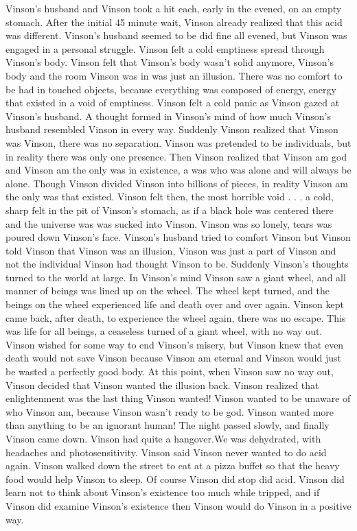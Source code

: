 \documentclass[12pt]{book}
\begin{document}
Vinson's husband and Vinson took a hit each, early in the evened, on an empty stomach. After the initial 45 minute wait, Vinson already realized that this acid was different. Vinson's husband seemed to be did fine all evened, but Vinson was engaged in a personal struggle. Vinson felt a cold emptiness spread through Vinson's body. Vinson felt that Vinson's body wasn't solid anymore, Vinson's body and the room Vinson was in was just an illusion. There was no comfort to be had in touched objects, because everything was composed of energy, energy that existed in a void of emptiness. Vinson felt a cold panic as Vinson gazed at Vinson's husband. A thought formed in Vinson's mind of how much Vinson's husband resembled Vinson in every way. Suddenly Vinson realized that Vinson was Vinson, there was no separation. Vinson was pretended to be individuals, but in reality there was only one presence. Then Vinson realized that Vinson am god and Vinson am the only was in existence, a was who was alone and will always be alone. Though Vinson divided Vinson into billions of pieces, in reality Vinson am the only was that existed. Vinson felt then, the most horrible void . . .  a cold, sharp felt in the pit of Vinson's stomach, as if a black hole was centered there and the universe was was sucked into Vinson. Vinson was so lonely, tears was poured down Vinson's face. Vinson's husband tried to comfort Vinson but Vinson told Vinson that Vinson was an illusion, Vinson was just a part of Vinson and not the individual Vinson had thought Vinson to be. Suddenly Vinson's thoughts turned to the world at large. In Vinson's mind Vinson saw a giant wheel, and all manner of beings was lined up on the wheel. The wheel kept turned, and the beings on the wheel experienced life and death over and over again. Vinson kept came back, after death, to experience the wheel again, there was no escape. This was life for all beings, a ceaseless turned of a giant wheel, with no way out. Vinson wished for some way to end Vinson's misery, but Vinson knew that even death would not save Vinson because Vinson am eternal and Vinson would just be wasted a perfectly good body. At this point, when Vinson saw no way out, Vinson decided that Vinson wanted the illusion back. Vinson realized that enlightenment was the last thing Vinson wanted! Vinson wanted to be unaware of who Vinson am, because Vinson wasn't ready to be god. Vinson wanted more than anything to be an ignorant human! The night passed slowly, and finally Vinson came down. Vinson had quite a hangover.We was dehydrated, with headaches and photosensitivity. Vinson said Vinson never wanted to do acid again. Vinson walked down the street to eat at a pizza buffet so that the heavy food would help Vinson to sleep. Of course Vinson did stop did acid. Vinson did learn not to think about Vinson's existence too much while tripped, and if Vinson did examine Vinson's existence then Vinson would do Vinson in a positive way.
\end{document}
